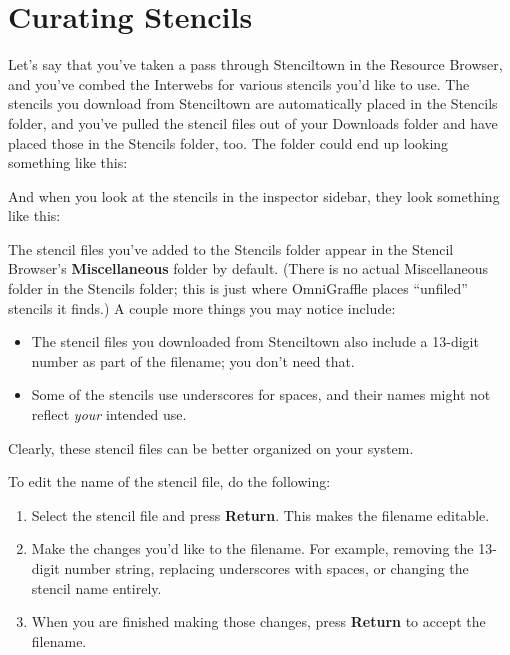 \documentclass[../main.tex]{subfiles}
\begin{document}
\section{Curating Stencils}

Let's say that you've taken a pass through Stenciltown in the Resource Browser, and you've
combed the Interwebs for various stencils you'd like to use. The stencils you download from
Stenciltown are automatically placed in the Stencils folder, and you've pulled the stencil
files out of your Downloads folder and have placed those in the Stencils folder, too. The
folder could end up looking something like this:


And when you look at the stencils in the inspector sidebar, they look something like this:


The stencil files you've added to the Stencils folder appear in the Stencil Browser's
\textbf{Miscellaneous} folder by default. (There is no actual Miscellaneous folder in the
Stencils folder; this is just where OmniGraffle places ``unfiled'' stencils it finds.) A
couple more things you may notice include:

\begin{itemize}
  \item The stencil files you downloaded from Stenciltown also include a 13-digit number as part
    of the filename; you don't need that.
  \item Some of the stencils use underscores for spaces, and their names might not reflect
    \textit{your} intended use.
\end{itemize}

Clearly, these stencil files can be better organized on your system.

To edit the name of the stencil file, do the following:

\begin{enumerate}
  \item Select the stencil file and press \textbf{Return}. This makes the filename editable.
  \item Make the changes you'd like to the filename. For example, removing the 13-digit number
    string, replacing underscores with spaces, or changing the stencil name entirely.
  \item When you are finished making those changes, press \textbf{Return} to accept the
    filename.
\end{enumerate}
\end{document}
